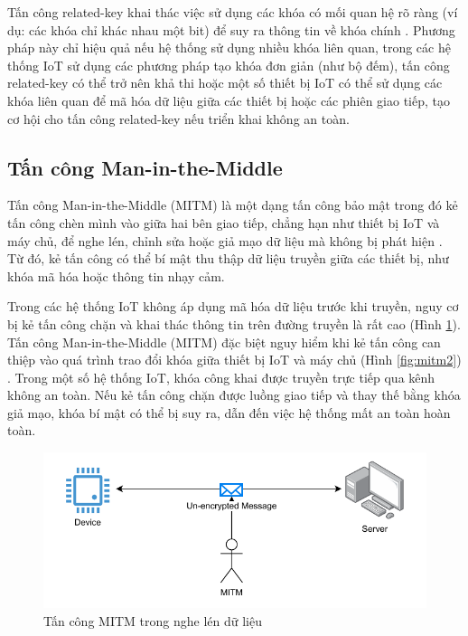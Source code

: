 Tấn công related-key khai thác việc sử dụng các khóa có mối quan hệ rõ ràng (ví dụ: các khóa chỉ khác nhau một bit) để suy ra thông tin về khóa chính \cite{Related-key-attack}. Phương pháp này chỉ hiệu quả nếu hệ thống sử dụng nhiều khóa liên quan, trong các hệ thống IoT sử dụng các phương pháp tạo khóa đơn giản (như bộ đếm), tấn công related-key có thể trở nên khả thi hoặc một số thiết bị IoT có thể sử dụng các khóa liên quan để mã hóa dữ liệu giữa các thiết bị hoặc các phiên giao tiếp, tạo cơ hội cho tấn công related-key nếu triển khai không an toàn.

\subsection{Tấn công Man-in-the-Middle}
\label{sec:mitm}
Tấn công Man-in-the-Middle (MITM) là một dạng tấn công bảo mật trong đó kẻ tấn công chèn mình vào giữa hai bên giao tiếp, chẳng hạn như thiết bị IoT và máy chủ, để nghe lén, chỉnh sửa hoặc giả mạo dữ liệu mà không bị phát hiện \cite{MITM}. Từ đó, kẻ tấn công có thể bí mật thu thập dữ liệu truyền giữa các thiết bị, như khóa mã hóa hoặc thông tin nhạy cảm. 

Trong các hệ thống IoT không áp dụng mã hóa dữ liệu trước khi truyền, nguy cơ bị kẻ tấn công chặn và khai thác thông tin trên đường truyền là rất cao (Hình \ref{fig:mitm1}). Tấn công Man-in-the-Middle (MITM) đặc biệt nguy hiểm khi kẻ tấn công can thiệp vào quá trình trao đổi khóa giữa thiết bị IoT và máy chủ (Hình \ref{fig:mitm2}) \cite{mitm-dh}. Trong một số hệ thống IoT, khóa công khai được truyền trực tiếp qua kênh không an toàn. Nếu kẻ tấn công chặn được luồng giao tiếp và thay thế bằng khóa giả mạo, khóa bí mật có thể bị suy ra, dẫn đến việc hệ thống mất an toàn hoàn toàn.

\begin{figure}[h]
    \centering
    \includegraphics[width=0.7\linewidth]{images/MITM2.pdf}
    \caption{Tấn công MITM trong nghe lén dữ liệu}
    \label{fig:mitm1}
\end{figure}

